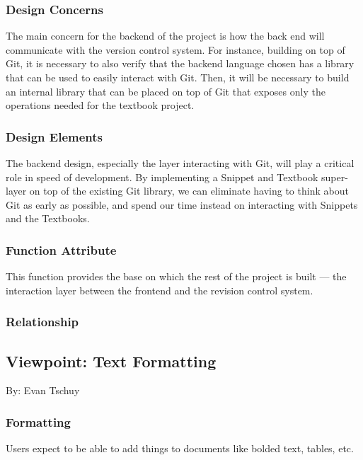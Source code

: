 \documentclass[letterpaper, 10pt, draftclsnofoot, compsoc, onecolumn]{IEEEtran}
\begin{document}
\subsubsection{Design Concerns}
The main concern for the backend of the project is how the back end will communicate
with the version control system. For instance, building on top of Git, it is
necessary to also verify that the backend language chosen has a library that can
be used to easily interact with Git. Then, it will be necessary to build an internal
library that can be placed on top of Git that exposes only the operations needed
for the textbook project.
{\noindent  \par}

\subsubsection{Design Elements}
{\noindent
The backend design, especially the layer interacting with Git, will play a critical
role in speed of development. By implementing a Snippet and Textbook super-layer
on top of the existing Git library, we can eliminate having to think about Git
as early as possible, and spend our time instead on interacting with Snippets and
the Textbooks.
\par}

\subsubsection{Function Attribute}
{\noindent This function provides the base on which the rest of the project is
built — the interaction layer between the frontend and the revision control system. \par}

\subsubsection{Relationship}






\subsection{Viewpoint: Text Formatting}
{\noindent By: Evan Tschuy \par}

\subsubsection{Formatting}
Users expect to be able to add things to documents like bolded text, tables, etc.
\end{document}
